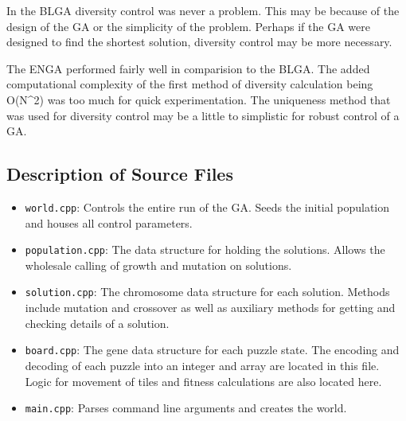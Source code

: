 \documentclass[]{article}
\begin{document}
In the BLGA diversity control was never a problem. This may be because
of the design of the GA or the simplicity of the problem. Perhaps if the
GA were designed to find the shortest solution, diversity control may be
more necessary.

The ENGA performed fairly well in comparision to the BLGA. The added
computational complexity of the first method of diversity calculation
being O(N\^{}2) was too much for quick experimentation. The uniqueness
method that was used for diversity control may be a little to simplistic
for robust control of a GA.

\subsection{Description of Source
Files}\label{description-of-source-files}

\begin{itemize}
\itemsep1pt\parskip0pt
\item
  \texttt{world.cpp}: Controls the entire run of the GA. Seeds the
  initial population and houses all control parameters.
\item
  \texttt{population.cpp}: The data structure for holding the solutions.
  Allows the wholesale calling of growth and mutation on solutions.
\item
  \texttt{solution.cpp}: The chromosome data structure for each
  solution. Methods include mutation and crossover as well as auxiliary
  methods for getting and checking details of a solution.
\item
  \texttt{board.cpp}: The gene data structure for each puzzle state. The
  encoding and decoding of each puzzle into an integer and array are
  located in this file. Logic for movement of tiles and fitness
  calculations are also located here.
\item
  \texttt{main.cpp}: Parses command line arguments and creates the
  world.
\end{itemize}
\end{document}
